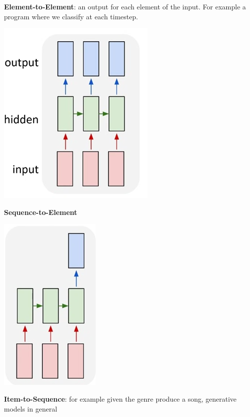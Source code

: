 \documentclass[10pt]{report}
\begin{document}
\begin{multicols}{2}
\begin{list}{}{}
	\item \textbf{Element-to-Element}: an output for each element of the input. For example a program where we classify at each timestep.
	\begin{center}
		\includegraphics[scale=0.5]{86.png}
	\end{center}
	\item \textbf{Sequence-to-Element}
	\begin{center}
		\includegraphics[scale=0.5]{87.png}
	\end{center}
	\item \textbf{Item-to-Sequence}: for example given the genre produce a song, generative models in general
	\begin{center}

\end{center}
\end{list}
\end{multicols}
\end{document}
